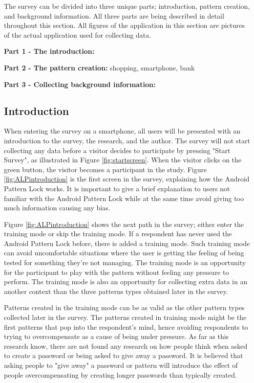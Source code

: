   The survey can be divided into three unique parts; introduction, pattern creation, and background information. All three parts are being described in detail throughout this section. All figures of the application in this section are pictures of the actual application used for collecting data.

  {\bf Part 1 - The introduction:} 

  {\bf Part 2 - The pattern creation:} shopping, smartphone, bank

  {\bf Part 3 - Collecting background information:}

    \subsection{Introduction}
    When entering the survey on a smartphone, all users will be presented with an introduction to the survey, the research, and the author. The survey will not start collecting any data before a visitor decides to participate by pressing "Start Survey", as illustrated in Figure \ref{fig:startscreen}. When the visitor clicks on the green button, the visitor becomes a participant in the study. Figure \ref{fig:ALPintroduction} is the first screen in the survey, explaining how the Android Pattern Lock works. It is important to give a brief explanation to users not familiar with the Android Pattern Lock while at the same time avoid giving too much information causing any bias.

    Figure \ref{fig:ALPintroduction} shows the next path in the survey; either enter the training mode or skip the training mode. If a respondent has never used the Android Pattern Lock before, there is added a training mode. Such training mode can avoid uncomfortable situations where the user is getting the feeling of being tested for something they're not managing. The training mode is an opportunity for the participant to play with the pattern without feeling any pressure to perform. The training mode is also an opportunity for collecting extra data in an another context than the three patterns types obtained later in the survey.

    Patterns created in the training mode can be as valid as the other pattern types collected later in the survey. The patterns created in training mode might be the first patterns that pop into the respondent's mind, hence avoiding respondents to trying to overcompensate as a cause of being under pressure. As far as this research know, there are not found any research on how people think when asked to create a password or being asked to give away a password. It is believed that asking people to "give away" a password or pattern will introduce the effect of people overcompensating by creating longer passwords than typically created.  

